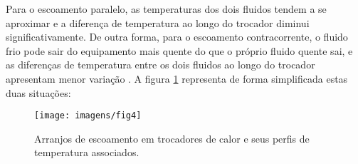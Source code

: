  Para o escoamento paralelo, as temperaturas dos dois fluidos tendem a se aproximar e a diferença de temperatura ao longo do trocador diminui significativamente. De outra forma, para o escoamento contracorrente, o fluido frio pode sair do equipamento mais quente do que o próprio fluido quente sai, e as diferenças de temperatura entre os dois fluidos ao longo do trocador apresentam menor variação \cite{cengel_2012_transferencia}. A figura \ref{fig:fig4} representa de forma simplificada estas duas situações:
 
 
 \begin{figure}[h]
 	\centering
 	\caption{Arranjos de escoamento em trocadores de calor e seus perfis de temperatura associados.}
 	\label{fig:fig4}
 	\texttt{[image: imagens/fig4]}
 	
 \end{figure}
 
 